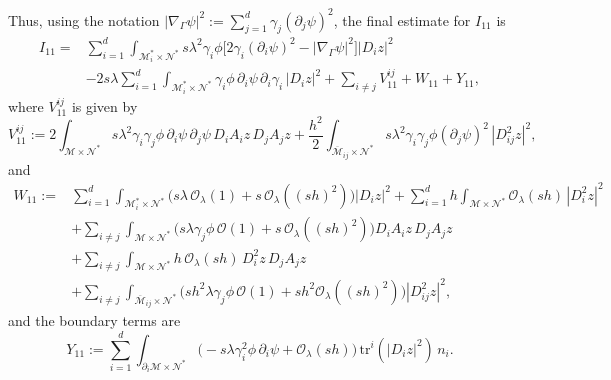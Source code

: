 \documentclass[11pt,oneside,leqno]{amsart}
\numberwithin{equation}{section}
\numberwithin{equation}{section}
\begin{document}
Thus, using the notation $|\nabla_{\Gamma}\psi|^{2}:=\sum_{j=1}^{d}\gamma_{j}(\partial_{j}\psi)^{2}$, the final estimate for $I_{11}$ is
\begin{equation}\label{eq:I11:final}
\begin{aligned}
I_{11}=&\sum_{i=1}^{d}\int_{\mathcal{M}_{i}^{\ast}\times\mathcal{N}^{\ast}}s\lambda^{2}\gamma_{i}\phi\Big[2\gamma_{i}(\partial_{i}\psi)^{2}-|\nabla_{\Gamma}\psi|^{2}\Big]|D_{i}z|^{2}\\
&-2s\lambda\sum_{i=1}^{d}\int_{\mathcal{M}_{i}^{\ast}\times\mathcal{N}^{\ast}}\gamma_{i}\phi\,\partial_{i}\psi\,\partial_{i}\gamma_{i}\,|D_{i}z|^{2}+\sum_{i\ne j}V_{11}^{ij}+W_{11}+Y_{11},
\end{aligned}
\end{equation}
where  $V_{11}^{ij}$ is given by
\begin{equation}\label{eq:V11}
V_{11}^{ij}:=2\int_{\mathcal{M}\times\mathcal{N}^{\ast}}s\lambda^{2}\gamma_{i}\gamma_{j}\phi\,\partial_{i}\psi\,\partial_{j}\psi\,D_{i}A_{i}z\,D_{j}A_{j}z+\frac{h^{2}}{2}\int_{\overline{\mathcal{M}}_{ij}\times\mathcal{N}^{\ast}}s\lambda^{2}\gamma_{i}\gamma_{j}\phi(\partial_{j}\psi)^{2}\,|D_{ij}^{2}z|^{2},
\end{equation}
and 
\begin{equation}\label{eq:W11}
\begin{aligned}
W_{11}:=&\sum_{i=1}^{d}\int_{\mathcal{M}_{i}^{\ast}\times\mathcal{N}^{\ast}}\Big(s\lambda\,\mathcal{O}_{\lambda}(1)+s\,\mathcal{O}_{\lambda}((sh)^{2})\Big)|D_{i}z|^{2}+\sum_{i=1}^{d}h\int_{\mathcal{M}\times\mathcal{N}^{\ast}}\mathcal{O}_{\lambda}(sh)\,|D_{i}^{2}z|^{2}\\
&+\sum_{i\ne j}\int_{\mathcal{M}\times\mathcal{N}^{\ast}}\Big(s\lambda\gamma_{j}\phi\,\mathcal{O}(1)+s\,\mathcal{O}_{\lambda}((sh)^{2})\Big)D_{i}A_{i}z\,D_{j}A_{j}z\\
&+\sum_{i\ne j}\int_{\mathcal{M}\times\mathcal{N}^{\ast}}h\,\mathcal{O}_{\lambda}(sh)\,D_{i}^{2}z\,D_{j}A_{j}z\\
&+\sum_{i\ne j}\int_{\overline{\mathcal{M}}_{ij}\times\mathcal{N}^{\ast}}\Big(sh^{2}\lambda\gamma_{j}\phi\,\mathcal{O}(1)+sh^{2}\mathcal{O}_{\lambda}((sh)^{2})\Big)|D_{ij}^{2}z|^{2},
\end{aligned}
\end{equation}
and the boundary terms are
\begin{equation}\label{eq:Y11}
Y_{11}:=\sum_{i=1}^{d}\int_{\partial_{i}\mathcal{M}\times\mathcal{N}^{\ast}}\Big(-s\lambda\gamma_{i}^{2}\phi\,\partial_{i}\psi+\mathcal{O}_{\lambda}(sh)\Big)\,\mathrm{tr}^{i}(|D_{i}z|^{2})\,n_{i}.
\end{equation}
\end{document}
